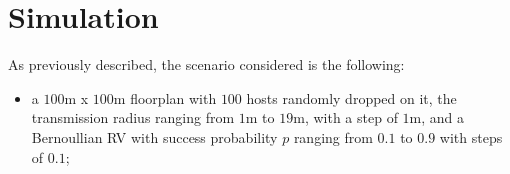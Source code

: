 %
\chapter{Simulation}\label{ch:simulation}
As previously described, the scenario considered is the following:
\begin{itemize}
    \item a $100$m x $100$m floorplan with $100$ hosts randomly dropped on it,
	the transmission radius ranging from $1$m to $19$m, with a step of $1$m,
	and a Bernoullian RV with success probability $p$ ranging from $0.1$ to $0.9$
	with steps of $0.1$;
\end{itemize}
